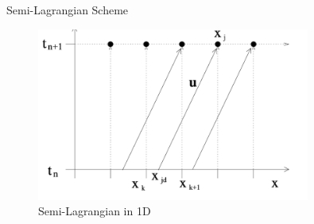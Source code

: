 \begin{frame}{Semi-Lagrangian Scheme}
    
    \begin{figure}
        \centering
        \includegraphics[width=0.8\textwidth]{images/11.png}
        \caption{Semi-Lagrangian in 1D}
    \end{figure}

\end{frame}